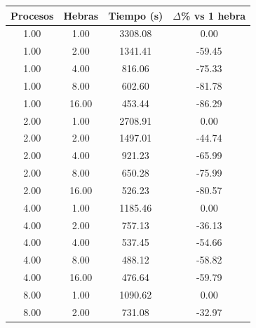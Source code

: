 \begin{table}[ht]
    \centering
    \begin{tabular}{|c|c|c|c|}
        \hline
        \textbf{Procesos} & \textbf{Hebras} & \textbf{Tiempo (s)} & \textbf{$\Delta$\% vs 1 hebra} \\
        \hline
        1.00              & 1.00            & 3308.08             & 0.00                           \\
        1.00              & 2.00            & 1341.41             & -59.45                         \\
        1.00              & 4.00            & 816.06              & -75.33                         \\
        1.00              & 8.00            & 602.60              & -81.78                         \\
        1.00              & 16.00           & 453.44              & -86.29                         \\
        2.00              & 1.00            & 2708.91             & 0.00                           \\
        2.00              & 2.00            & 1497.01             & -44.74                         \\
        2.00              & 4.00            & 921.23              & -65.99                         \\
        2.00              & 8.00            & 650.28              & -75.99                         \\
        2.00              & 16.00           & 526.23              & -80.57                         \\
        4.00              & 1.00            & 1185.46             & 0.00                           \\
        4.00              & 2.00            & 757.13              & -36.13                         \\
        4.00              & 4.00            & 537.45              & -54.66                         \\
        4.00              & 8.00            & 488.12              & -58.82                         \\
        4.00              & 16.00           & 476.64              & -59.79                         \\
        8.00              & 1.00            & 1090.62             & 0.00                           \\
        8.00              & 2.00            & 731.08              & -32.97                         \\

\end{tabular}
\end{table}
